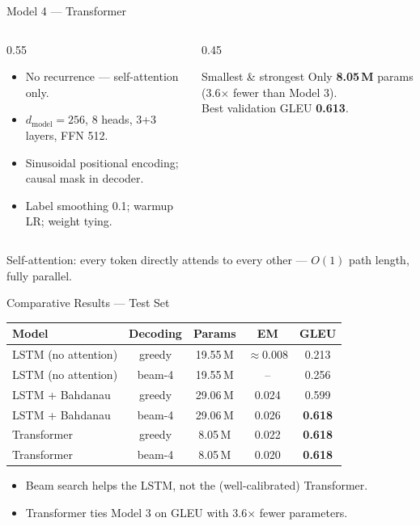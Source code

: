 \documentclass[aspectratio=169,11pt]{beamer}
\begin{document}
\begin{frame}{Model 4 --- Transformer}
\begin{columns}
\begin{column}{0.55\textwidth}
\begin{itemize}
  \item No recurrence --- self-attention only.
  \item $d_{\text{model}}{=}256$, 8 heads, 3+3 layers, FFN 512.
  \item Sinusoidal positional encoding; causal mask in decoder.
  \item Label smoothing 0.1; warmup LR; weight tying.
\end{itemize}
\end{column}
\begin{column}{0.45\textwidth}
\begin{block}{Smallest \& strongest}
Only \textbf{8.05\,M} params (3.6$\times$ fewer than Model 3).\\
Best validation GLEU \textbf{0.613}.
\end{block}
\end{column}
\end{columns}
\vspace{0.4em}
\centering \small Self-attention: every token directly attends to every other ---
$O(1)$ path length, fully parallel.
\end{frame}

\begin{frame}{Comparative Results --- Test Set}
\centering
\begin{tabular}{l c c c c}
\toprule
Model & Decoding & Params & EM & GLEU \\
\midrule
LSTM (no attention) & greedy & 19.55\,M & $\approx$0.008 & 0.213 \\
LSTM (no attention) & beam-4 & 19.55\,M & --             & 0.256 \\
LSTM + Bahdanau     & greedy & 29.06\,M & 0.024          & 0.599 \\
LSTM + Bahdanau     & beam-4 & 29.06\,M & 0.026          & \textbf{0.618} \\
Transformer         & greedy & 8.05\,M  & 0.022          & \textbf{0.618} \\
Transformer         & beam-4 & 8.05\,M  & 0.020          & \textbf{0.618} \\
\bottomrule
\end{tabular}
\vspace{0.8em}
\begin{itemize}\small
  \item Beam search helps the LSTM, not the (well-calibrated) Transformer.
  \item Transformer ties Model 3 on GLEU with 3.6$\times$ fewer parameters.
\end{itemize}
\end{frame}
\end{document}
